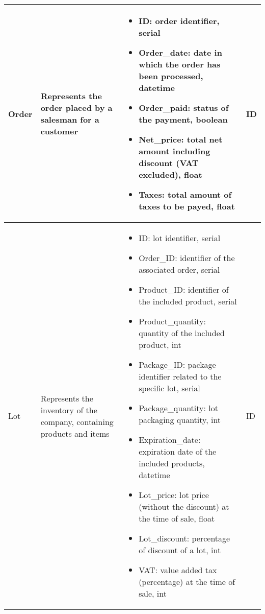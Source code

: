 \begin{longtable}{|p{}|p{} |p{}|p{} |}
    Order & Represents the order placed by a salesman for a customer &
    \begin{itemize}
        \vspace{-1em}
        \item ID:   order identifier, serial
        \item Order\_date:   date in which the order has been processed, datetime
        \item Order\_paid:   status of the payment, boolean
        \item Net\_price:   total net amount including discount (VAT excluded), float    %
        \item Taxes:   total amount of taxes to be payed, float                     %
    \end{itemize}
    &  ID \\\hline


    Lot & Represents the inventory of the company, containing products and items &
    \begin{itemize}
        \vspace{-1em}
        \item ID:   lot identifier, serial
        \item Order\_ID:   identifier of the associated order, serial     %
        \item Product\_ID:   identifier of the included product, serial
        \item Product\_quantity:   quantity of the included product, int
        \item Package\_ID:   package identifier related to the specific lot, serial
        \item Package\_quantity:   lot packaging quantity, int
        \item Expiration\_date:   expiration date of the included products, datetime
        \item Lot\_price:   lot price (without the discount) at the time of sale, float
        \item Lot\_discount:   percentage of discount of a lot, int
        \item VAT:   value added tax (percentage) at the time of sale, int
    \end{itemize}
    &  ID \\\hline


\end{longtable}
